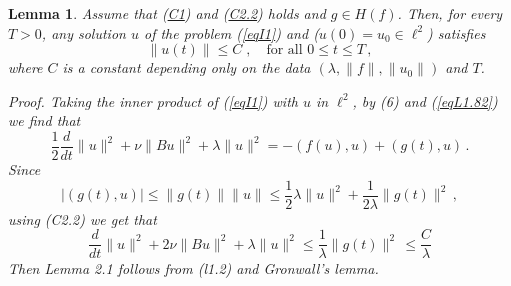 \documentclass{amsart}%
\newtheorem{lemma}{Lemma}[section]
\begin{document}
{\color{violet}
\begin{lemma} \textit{Assume that (\hyperref[C1]{C1}) and (\hyperref[C2.2]{C2.2}) holds and $g \in H(f)$. Then, for every $T > 0$, any solution $u$ of the problem (\ref{eqI1}) and (\(u(0)=u_0 \in \ell^2\)) satisfies}
\[
\|u(t)\| \le C \;,\quad \text{for all } 0 \le t \le T\,,
\]
\textit{where $C$ is a constant depending only on the data $(\lambda, \|f\|, \|u_0\|)$ and $T$.}

\textit{Proof.} \; Taking the inner product of (\ref{eqI1}) with $u$ in $\ell^2$, by (6) and (\ref{eqL1.82}) we find that
\[
\frac{1}{2} \frac{d}{dt} \|u\|^2 + \nu \|Bu\|^2 + \lambda \|u\|^2 = -(f(u), u) + (g(t), u)\,.
\tag{l1.1}
\]
Since
\[
|(g(t),u)| \le \|g(t)\|\|u\| \le \frac{1}{2}\lambda \|u\|^2 + \frac{1}{2\lambda}\|g(t)\|^2\,,
\]
using (C2.2) we get that
\[
\frac{d}{dt}\|u\|^2 + 2\nu\|Bu\|^2 + \lambda\|u\|^2 \le \frac{1}{\lambda}\|g(t)\|^2\, \leq \frac{C}{\lambda}
\tag{l1.2}
\]
Then Lemma 2.1 follows from (l1.2) and Gronwall's
lemma. 
\end{lemma}
}
\end{document}
